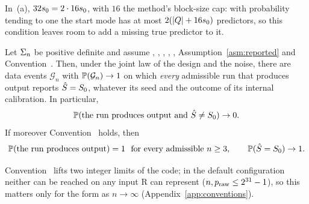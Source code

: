 In~(a), $32\sz=2\cdot16\sz$, with $16$ the method's block-size cap: with probability tending to one the start mode has at
most $2(\abs{Q}+16\sz)$ predictors, so this condition leaves room to add a missing true predictor to it.

\begin{theorem}\label{thm:reported}
Let $\Sig$ be positive definite and assume , , , , , Assumption~\ref{asm:reported}
and Convention~. Then, under the joint law of the design and the noise, there are data events $\mathcal G_n$ with
$\P(\mathcal G_n)\to1$ on which \emph{every} admissible run that produces output reports $\Shat=\Sz$, whatever its seed and the
outcome of its internal calibration. In particular,
\begin{equation}\label{eq:reported}
  \P(\text{the run produces output and }\Shat\neq\Sz)\to0 .
\end{equation}
If moreover Convention~ holds, then
\begin{equation}\label{eq:delivery}
  \P(\text{the run produces output})=1\ \ \text{for every admissible }n\ge3,\qquad \P(\Shat=\Sz)\to1 .
\end{equation}
\end{theorem}

Convention~ lifts two integer limits of the code; in the default configuration neither can be reached on any input
R can represent ($n,\praw\le2^{31}-1$), so this matters only for the form as $n\to\infty$ (Appendix~\ref{app:conventions}).



